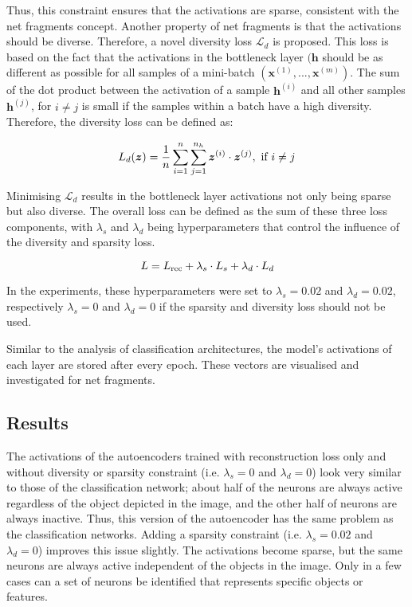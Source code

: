 Thus, this constraint ensures that the activations are sparse, consistent with the net fragments concept.
Another property of net fragments is that the activations should be diverse.
Therefore, a novel diversity loss $\mathcal{L}_{d}$ is proposed.
This loss is based on the fact that the activations in the bottleneck layer $(\boldsymbol{h}$ should be as different as possible for all samples of a mini-batch $(\boldsymbol{x}^{(1)}, ..., \boldsymbol{x}^{(m)})$.
The sum of the dot product between the activation of a sample $\boldsymbol{h}^{(i)}$ and all other samples $\boldsymbol{h}^{(j)}$, for $i \neq j$ is small if the samples within a batch have a high diversity. Therefore, the diversity loss can be defined as:

\begin{equation}\eqlbl{ae_kldl2}
		L_{d}(\boldsymbol{z}) = \frac{1}{n} \sum_{i=1}^n\sum_{j=1}^{n_h} \boldsymbol{z}^{(i)} \cdot \boldsymbol{z}^{(j)}, \text{ if } i\neq j
\end{equation}

Minimising $\mathcal{L}_{d}$ results in the bottleneck layer activations not only being sparse but also diverse. 
The overall loss can be defined as the sum of these three loss components, with $\lambda_s$ and $\lambda_d$ being hyperparameters that control the influence of the diversity and sparsity loss.

\begin{equation}\eqlbl{ae_kldl2}
		L = L_{\text{rec}} + \lambda_s \cdot L_{s} + \lambda_d \cdot L_{d}
\end{equation}

In the experiments, these hyperparameters were set to $\lambda_s = 0.02$ and $\lambda_d = 0.02$, respectively $\lambda_s = 0$ and $\lambda_d = 0$ if the sparsity and diversity loss should not be used.

Similar to the analysis of classification architectures, the model's activations of each layer are stored after every epoch.
These vectors are visualised and investigated for net fragments.

\subsection{Results}
The activations of the autoencoders trained with reconstruction loss only and without diversity or sparsity constraint (i.e. $\lambda_s = 0$ and $\lambda_d = 0$) look very similar to those of the classification network; about half of the neurons are always active regardless of the object depicted in the image, and the other half of neurons are always inactive. Thus, this version of the autoencoder has the same problem as the classification networks. Adding a sparsity constraint (i.e. $\lambda_s = 0.02$ and $\lambda_d = 0$) improves this issue slightly. The activations become sparse, but the same neurons are always active independent of the objects in the image. Only in a few cases can a set of neurons be identified that represents specific objects or features.

